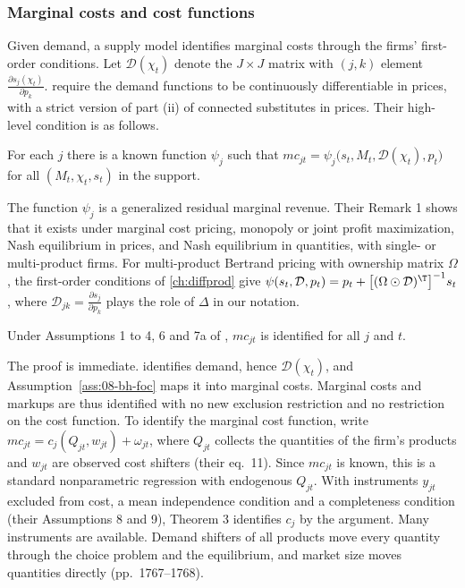 \subsubsection{Marginal costs and cost functions}

Given demand, a supply model identifies marginal costs through the firms' first-order conditions. Let
$\mathcal{D}(\chi_t)$ denote the $J \times J$ matrix with $(j,k)$ element $\frac{\partial s_j(\chi_t)}{\partial
p_k}$. \citet[Assumption 6]{BerryHaile2014} require the demand functions to be continuously differentiable in
prices, with a strict version of part (ii) of connected substitutes in prices. Their high-level condition is as
follows.

\begin{assumption}\label{ass:08-bh-foc}
For each $j$ there is a known function $\psi_j$ such that $mc_{jt} = \psi_j\big(s_t, M_t, \mathcal{D}(\chi_t),
p_t\big)$ for all $(M_t, \chi_t, s_t)$ in the support.
\end{assumption}

The function $\psi_j$ is a generalized residual marginal revenue. Their Remark 1 shows that it exists under
marginal cost pricing, monopoly or joint profit maximization, Nash equilibrium in prices, and Nash equilibrium
in quantities, with single- or multi-product firms. For multi-product Bertrand pricing with ownership matrix
$\Omega$, the first-order conditions of \cref{ch:diffprod} give $\psi(s_t, \mathcal{D}, p_t) = p_t +
\big[(\Omega \odot \mathcal{D})^\T\big]^{-1}s_t$, where $\mathcal{D}_{jk} = \frac{\partial s_j}{\partial p_k}$
plays the role of $\Delta$ in our notation.

\begin{theorem}\label{thm:08-bh-mc}
Under Assumptions 1 to 4, 6 and 7a of \citet{BerryHaile2014}, $mc_{jt}$ is identified for all $j$ and $t$.
\end{theorem}

The proof is immediate.  identifies demand, hence $\mathcal{D}(\chi_t)$, and
Assumption~\ref{ass:08-bh-foc} maps it into marginal costs. Marginal costs and markups are thus identified with no new
exclusion restriction and no restriction on the cost function. To identify the marginal cost function, write
$mc_{jt} = c_j(Q_{jt}, w_{jt}) + \omega_{jt}$, where $Q_{jt}$ collects the quantities of the firm's products and
$w_{jt}$ are observed cost shifters (their eq.~11). Since $mc_{jt}$ is known, this is a standard nonparametric
regression with endogenous $Q_{jt}$. With instruments $y_{jt}$ excluded from cost, a mean independence
condition and a completeness condition (their Assumptions 8 and 9), Theorem 3 identifies $c_j$ by the
\citet{NeweyPowell2003} argument. Many instruments are available. Demand shifters of all products move every
quantity through the choice problem and the equilibrium, and market size moves quantities directly (pp.~1767--1768).

